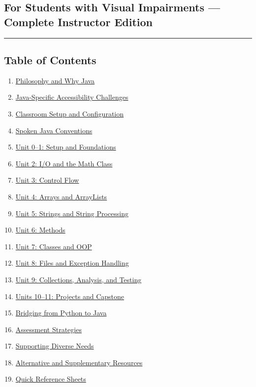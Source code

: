 \documentclass[
  justified,
  openright,
]{tufte-book}
\providecommand{\tightlist}{%
  \setlength{\itemsep}{0pt}\setlength{\parskip}{0pt}}
\begin{document}
\subsection{For Students with Visual Impairments --- Complete Instructor
Edition}\label{for-students-with-visual-impairments-complete-instructor-edition}

\begin{center}\rule{0.5\linewidth}{0.5pt}\end{center}

\subsection{Table of Contents}\label{table-of-contents}

\begin{enumerate}
\def\labelenumi{\arabic{enumi}.}
\tightlist
\item
  \hyperref[philosophy-and-why-java]{Philosophy and Why Java}
\item
  \hyperref[java-specific-accessibility-challenges]{Java-Specific
  Accessibility Challenges}
\item
  \hyperref[classroom-setup-and-configuration]{Classroom Setup and
  Configuration}
\item
  \hyperref[spoken-java-conventions]{Spoken Java Conventions}
\item
  \hyperref[unit-01-setup-and-foundations]{Unit 0--1: Setup and
  Foundations}
\item
  \hyperref[unit-2-io-and-the-math-class]{Unit 2: I/O and the Math
  Class}
\item
  \hyperref[unit-3-control-flow]{Unit 3: Control Flow}
\item
  \hyperref[unit-4-arrays-and-arraylists]{Unit 4: Arrays and ArrayLists}
\item
  \hyperref[unit-5-strings-and-string-processing]{Unit 5: Strings and
  String Processing}
\item
  \hyperref[unit-6-methods]{Unit 6: Methods}
\item
  \hyperref[unit-7-classes-and-oop]{Unit 7: Classes and OOP}
\item
  \hyperref[unit-8-files-and-exception-handling]{Unit 8: Files and
  Exception Handling}
\item
  \hyperref[unit-9-collections-analysis-and-testing]{Unit 9:
  Collections, Analysis, and Testing}
\item
  \hyperref[units-1011-projects-and-capstone]{Units 10--11: Projects and
  Capstone}
\item
  \hyperref[bridging-from-python-to-java]{Bridging from Python to Java}
\item
  \hyperref[assessment-strategies]{Assessment Strategies}
\item
  \hyperref[supporting-diverse-needs]{Supporting Diverse Needs}
\item
  \hyperref[alternative-and-supplementary-resources]{Alternative and
  Supplementary Resources}
\item
  \hyperref[quick-reference-sheets]{Quick Reference Sheets}
\end{enumerate}
\end{document}
